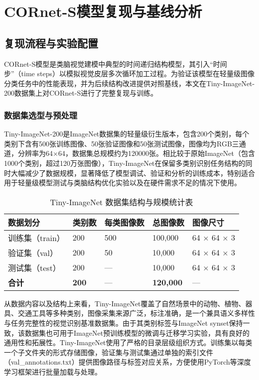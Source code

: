 
\chapter{CORnet-S模型复现与基线分析}

\section{复现流程与实验配置}

CORnet-S模型是类脑视觉建模中典型的时间递归结构模型，其引入“时间步”（time steps）以模拟视觉皮层多次循环加工过程。为验证该模型在轻量级图像分类任务中的性能表现，并为后续结构改进提供对照基线，本文在Tiny-ImageNet-200数据集上对CORnet-S进行了完整复现与训练。

\subsection{数据集选型与预处理}

Tiny-ImageNet-200是ImageNet数据集的轻量级衍生版本，包含200个类别，每个类别下含有500张训练图像、50张验证图像和50张测试图像，图像均为RGB三通道，分辨率为64×64，数据集总规模约为120000张\cite{le2015tiny}。相比较于原始ImageNet（包含1000个类别，超过120万张图像），Tiny-ImageNet在保留多类别识别任务结构的同时大幅减少了数据规模，显著降低了模型调试、验证和分析的训练成本，特别适合用于轻量级模型测试与类脑结构优化实验以及在硬件需求不足的情况下使用。

\begin{table}[htb]
	\centering
	\caption{Tiny-ImageNet 数据集结构与规模统计表}
	\label{tab:tinyimagenet}
	\begin{tabular}{lllll}
		\hline
		数据划分 & 类别数 & 每类图像数 & 总图像数 & 图像尺寸 \\
		\hline
		训练集（train） & 200 & 500  & 100,000  & 64 × 64 × 3 \\
		验证集（val）   & 200 & 50   & 10,000   & 64 × 64 × 3 \\
		测试集（test）  & 200 & —    & 10,000   & 64 × 64 × 3 \\
		\textbf{合计}   & \textbf{200} & — & \textbf{120,000} & — \\
		\hline
	\end{tabular}
\end{table}

从数据内容以及结构上来看，Tiny-ImageNet覆盖了自然场景中的动物、植物、器具、交通工具等多种类别，图像采集来源广泛，标注准确，是一个兼具语义多样性与任务完整性的视觉识别基准数据集。由于其类别标签与ImageNet synset保持一致，该数据集也可用于ImageNet预训练模型的微调与迁移学习实验，具有良好的通用性和拓展性。Tiny-ImageNet使用了严格的目录层级组织方式。训练集以每类一个子文件夹的形式存储图像，验证集与测试集通过单独的索引文件（val\_annotations.txt）提供图像路径与标签对应关系，方便使用PyTorch等深度学习框架进行批量加载与处理。

